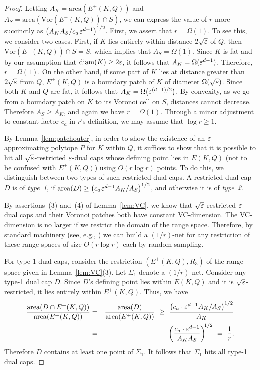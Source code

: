 \documentclass[11pt]{article}   \usepackage[letterpaper,hmargin=2.1cm,vmargin=3cm]{geometry}
\newcommand{\inv}[1]{\frac{1}{#1}}
\newcommand{\diam}{\mathrm{diam}}
\newcommand{\area}{\mathrm{area}}
\newcommand{\Vor}{\mathrm{Vor}}
\renewcommand{\P}{\kern+1pt}    \newcommand{\N}{\kern-2pt}      \newcommand{\NN}{\kern-4pt}     \newcommand{\polar}[1]{\mathrm{polar}(#1)}            \newcommand{\polarX}[2]{\mathrm{polar}_{#1}(#2)}
\begin{document}
\begin{proof}
Letting $A_K = \area(E^+(K,Q))$ and $A_S = \area\left(\Vor(E^+(K,Q)) \cap S\right)$, we can express the value of $r$ more succinctly as $\big(A_K A_S/c_a \P\eps^{d-1}\big)^{1/2}$. First, we assert that $r = \Omega(1)$. To see this, we consider two cases. First, if $K$ lies entirely within distance $2 \sqrt{\varepsilon}$ of $Q$, then $\Vor(E^+(K,Q)) \cap S = S$, which implies that $A_S = \Omega(1)$. Since $K$ is fat and by our assumption that $\diam(K) \ge 2 \eps$, it follows that $A_K = \Omega(\varepsilon^{d-1})$. Therefore, $r = \Omega(1)$. On the other hand, if some part of $K$ lies at distance greater than $2 \sqrt{\varepsilon}$ from $Q$, $E^+(K,Q)$ is a boundary patch of $K$ of diameter $\Omega(\sqrt{\varepsilon})$. Since both $K$ and $Q$ are fat, it follows that $A_K = \Omega\big(\varepsilon^{(d-1)/2}\big)$. By convexity, as we go from a boundary patch on $K$ to its Voronoi cell on $S$, distances cannot decrease. Therefore $A_S \ge A_K$, and again we have $r = \Omega(1)$. Through a minor adjustment to constant factor $c_a$ in $r$'s definition, we may assume that $\log r \ge 1$.

By Lemma~\ref{lem:patchouter}, in order to show the existence of an $\varepsilon$-approximating polytope $P$ for $K$ within $Q$, it suffices to show that it is possible to hit all $\sqrt{\varepsilon}$-restricted $\varepsilon$-dual caps whose defining point lies in $E(K,Q)$ (not to be confused with $E^+(K,Q)$) using $O(r \log r)$ points. To do this, we distinguish between two types of such restricted dual caps. A restricted dual cap $D$ is of \emph{type~1}, if $\area(D) \ge \big(c_a \P \eps^{d-1} A_K / A_S\big)^{1/2}$, and otherwise it is of \emph{type~2}.

By assertions~(3) and~(4) of Lemma~\ref{lem:VC}, we know that $\sqrt{\varepsilon}$-restricted $\varepsilon$-dual caps and their Voronoi patches both have constant VC-dimension. The VC-dimension is no larger if we restrict the domain of the range space. Therefore, by standard machinery (see, e.g., \cite{probabilistic}) we can build a $(1/r)$-net for any restriction of these range spaces of size $O(r \log r)$ each by random sampling. 

For type-1 dual caps, consider the restriction $(E^+(K,Q),R_3)$ of the range space given in Lemma~\ref{lem:VC}(3). Let $\Sigma_1$ denote a $(1/r)$-net. Consider any type-1 dual cap $D$. Since $D$'s defining point lies within $E(K,Q)$ and it is $\sqrt{\varepsilon}$-restricted, it lies entirely within $E^+(K,Q)$. Thus, we have
\begin{eqnarray*}
	\frac{\area(D \cap E^+(K,Q))}{\area(E^+(K,Q))} 
		&  =  & \frac{\area(D)}{\area(E^+(K,Q))} 
		~ \ge ~ \frac{\big(c_a \cdot \eps^{d-1} A_K / A_S\big)^{1/2}}{A_K} \\
		&  =  & \left(\frac{c_a \cdot \eps^{d-1}}{A_K A_S}\right)^{\N 1/2}
		~  =  ~ \inv{r}.
\end{eqnarray*}
Therefore $D$ contains at least one point of $\Sigma_1$. It follows that $\Sigma_1$ hits all type-1 dual caps.


\end{proof}
\end{document}
